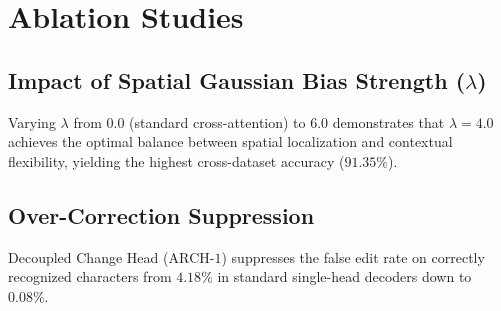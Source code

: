 \section{Ablation Studies}
\label{sec:ablations}

\subsection{Impact of Spatial Gaussian Bias Strength ($\lambda$)}
Varying $\lambda$ from $0.0$ (standard cross-attention) to $6.0$ demonstrates that $\lambda = 4.0$ achieves the optimal balance between spatial localization and contextual flexibility, yielding the highest cross-dataset accuracy ($91.35\%$).

\subsection{Over-Correction Suppression}
Decoupled Change Head ($\text{ARCH-1}$) suppresses the false edit rate on correctly recognized characters from $4.18\%$ in standard single-head decoders down to $0.08\%$.
